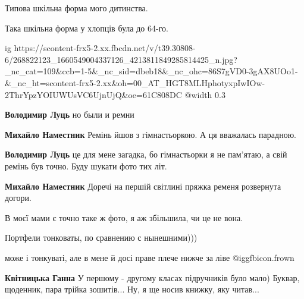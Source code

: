  
 
 
 
 

Типова шкільна форма мого дитинства.

Така шкільна форма у хлопців була до 64-го.

\ifcmt
  ig https://scontent-frx5-2.xx.fbcdn.net/v/t39.30808-6/268822123_1660549004337126_4213811849285814425_n.jpg?_nc_cat=109&ccb=1-5&_nc_sid=dbeb18&_nc_ohc=86S7gVD0-3gAX8UOo1-&_nc_ht=scontent-frx5-2.xx&oh=00_AT_HGT8MLHphotyxpIwIOw-2ThrYpzYOIUWUsVC6UjnUjQ&oe=61C808DC
  @width 0.3
\fi

\textbf{Володимир Луць} но были и ремни

\textbf{Михайло Наместник} Ремінь йшов з гімнастьоркою. А ця вважалась парадною.

\textbf{Володимир Луць} це для мене загадка, бо гімнастьорки я не пам'ятаю, а свій ремінь був точно. Буду шукати фото тих літ.

\textbf{Михайло Наместник} Доречі на першій світлині пряжка ременя розвернута догори.

В моєї мами є точно таке ж фото, я аж збільшила, чи це не вона.

Портфели тонковаты, по сравнению с нынешними)))

може і тонкуваті, але в мене й досі праве плече нижче за ліве  @igg{fbicon.frown} 

\textbf{Квітницька Ганна} У першому - другому класах підручників було мало) Буквар, щоденник, пара трійка зошитів...
Ну, я ще носив книжку, яку читав...
